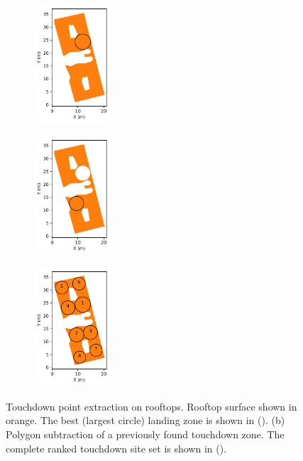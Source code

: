 \begin{figure}[ht]
  \centering
  \begin{subfigure}[b]{0.32\linewidth}
    \centering\includegraphics[width=80pt,height=125pt]{chapter_5_mapping/imgs/74200284_polygonbuffer_lc.pdf}
    \caption{\label{fig:ch5_polylabel_example}}
  \end{subfigure}
  \begin{subfigure}[b]{0.32\linewidth}
    \centering\includegraphics[width=80pt,height=125pt]{chapter_5_mapping/imgs/74200284_polygonbuffer_second_lc.pdf}
    \caption{\label{fig:ch5_polylabel_example_second}}
  \end{subfigure}%
  \begin{subfigure}[b]{0.32\linewidth}
    \centering\includegraphics[width=80pt,height=125pt]{chapter_5_mapping/imgs/74200284_polygonbuffer_all_lc.pdf}
    \caption{\label{fig:ch5_polylabel_example_all}}
  \end{subfigure}%
  \caption[Touchdown point extraction on rooftops]{Touchdown point extraction on rooftops. Rooftop surface shown in orange. The best (largest circle) landing zone is shown in (). (b) Polygon subtraction of a previously found touchdown zone. The complete ranked touchdown site set is shown in ().}
  \label{fig:ch5_touchdown_zones}
\end{figure}

